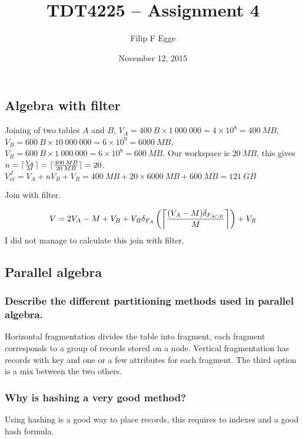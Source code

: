 \documentclass{article}
\DeclarePairedDelimiter{\ceil}{\lceil}{\rceil}
\begin{document}
 
\title{TDT4225 -- Assignment 4} 
\author{Filip F Egge}
\date{November 12, 2015} 
\maketitle

\newpage
\subsection*{Algebra with filter}
Joining of two tables $A$ and $B$, $V_A = 400\:B \times 1\:000\:000 = 4 \times 10^8 = 400\:MB$, $V_B = 600\:B \times 10\:000\:000 = 6 \times 10^9 = 6000\:MB$,
$V_R = 600\:B \times 1\:000\:000 = 6 \times 10^8 = 600\:MB$. Our workspace is $20\:MB$, this gives $n = \ceil{\frac{V_A}{M}} = \ceil{\frac{400\:MB}{20\:MB}} = 20$.
$V_{nl}^J = V_A + nV_B + V_R = 400\:MB + 20 \times 6000\:MB + 600\:MB = 121\:GB$

Join with filter.

\[
    V = 2V_A - M + V_B + V_B \delta_{F_A} \left( \ceil*{\frac{(V_A - M) \delta_{F_{A\cap B}}}{M}}\right) + V_R
\]
I did not manage to calculate this join with filter.

\subsection*{Parallel algebra}
\subsubsection*{Describe the different partitioning methods used in parallel algebra.}
Horizontal fragmentation divides the table into fragment, each fragment corresponds to a group of records stored on a node.
Vertical fragmentation has records with key and one or a few attributes for each fragment. The third option is a 
mix between the two others. 
\subsubsection*{Why is hashing a very good method?}
Using hashing is a good way to place records, this requires to indexes and a good hash formula.
\end{document}
